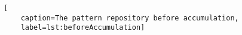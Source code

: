 
\begin{lstlisting}[
	caption=The pattern repository before accumulation,
	label=lst:beforeAccumulation]
	
\end{lstlisting}
